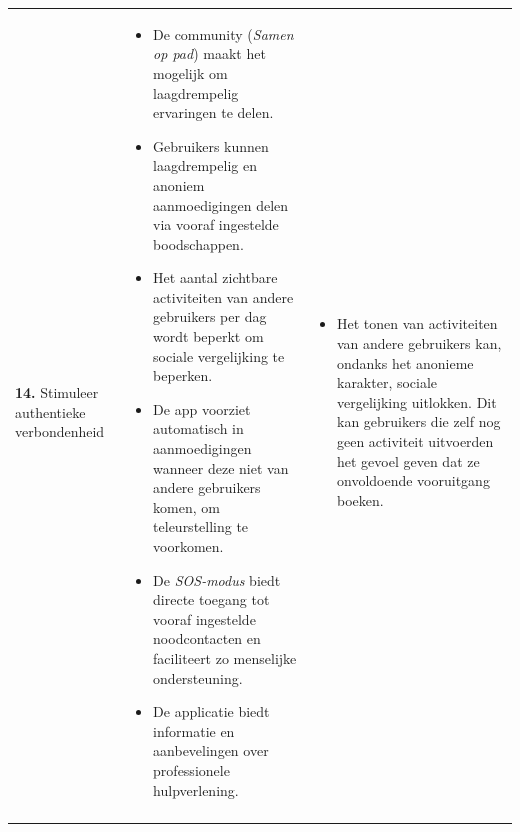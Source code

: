 {\begin{longtable}{
            >{\raggedright\arraybackslash}p{5.23cm}
            >{\raggedright\arraybackslash}p{4.93cm}
            >{\raggedright\arraybackslash}p{4.93cm}
        }
        \textbf{14.} Stimuleer authentieke verbondenheid 
        &  
        \begin{itemize}[nosep,leftmargin=*,itemsep=10pt] 
            \renewcommand{\labelitemi}{+} 
            \item De community (\textit{Samen op pad}) maakt het mogelijk om laagdrempelig ervaringen te delen.
            \item Gebruikers kunnen laagdrempelig en anoniem aanmoedigingen delen via vooraf ingestelde boodschappen.
            \item Het aantal zichtbare activiteiten van andere gebruikers per dag wordt beperkt om sociale vergelijking te beperken.
            \item De app voorziet automatisch in aanmoedigingen wanneer deze niet van andere gebruikers komen, om teleurstelling te voorkomen.
            \item De \textit{SOS-modus} biedt directe toegang tot vooraf ingestelde noodcontacten en faciliteert zo menselijke ondersteuning.
            \item De applicatie biedt informatie en aanbevelingen over professionele hulpverlening.
        \end{itemize} 
        &  
        \begin{itemize}[nosep,leftmargin=*,itemsep=10pt] 
            \renewcommand{\labelitemi}{-} 
            \item Het tonen van activiteiten van andere gebruikers kan, ondanks het anonieme karakter, sociale vergelijking uitlokken. Dit kan gebruikers die zelf nog geen activiteit uitvoerden het gevoel geven dat ze onvoldoende vooruitgang boeken.
        \end{itemize} 
        \\
        
        \addlinespace[5pt]
        

\end{longtable}}
